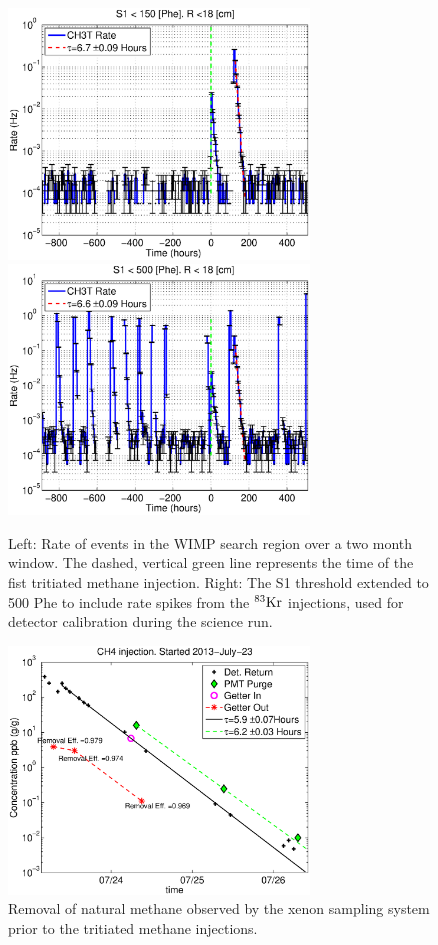 \begin{figure}[H]\centering
\includegraphics[width=80mm]{CH3T_Rate_fid_150_lux10_20130813T1120_note.eps}
\includegraphics[width=80mm]{CH3T_Rate_fid_500_lux10_20130813T1120.eps}
\caption{Left: Rate of events in the WIMP search region over a two month window. The dashed, vertical green line represents the time of the fist tritiated methane injection. Right: The S1 threshold extended to 500 Phe to include rate spikes from the $\rm ^{83}Kr$ injections, used for detector calibration during the science run. }
\label{fig:Removal}
\end{figure}

\begin{figure}[H]\centering
\includegraphics[width=80mm]{CH4_injection.eps}
\caption{Removal of natural methane observed by the xenon sampling system prior to the tritiated methane injections. }
\label{fig:Removal}
\end{figure}


